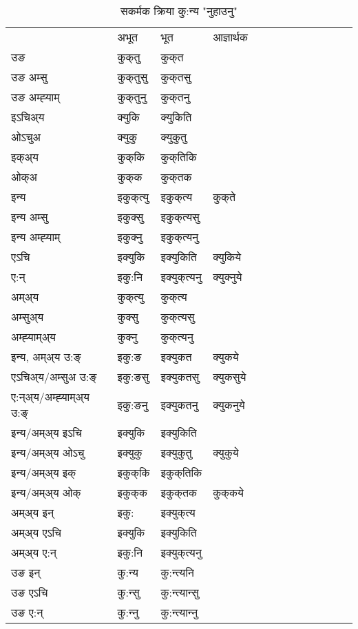 \begin{table}[H]
\centering
\caption{\label{ukt.vt} सकर्मक क्रिया  कु:न्य  "नुहाउनु"  }
\begin{tabular}{l|l|l|l|l|l|l|l|l|l|l|l|l}  \toprule
&अभूत & भूत & आज्ञार्थक \\ 
उङ &कुक्‌तु &कुक्‌त \\ 
उङ अम्सु&कुक्‌तुसु &कुक्‌तसु \\ 
उङ अम्ह्‍याम्&कुक्‌तुनु &कुक्‌तनु \\ 
इऽचिअ्य &क्युकि &क्युकिति   \\ 
ओऽचुअ        &क्युकु &क्युकुतु   \\ 
इक्अ्य&कुक्‌कि &कुक्‌तिकि   \\ 
ओक्अ &कुक्‌क &कुक्‌तक   \\ 
इन्य & इकुक्‌त्यु  & इकुक्‌त्य &कुक्‌ते  \\ 
इन्य अम्सु& इकुक्सु  & इकुक्‌त्यसु   \\ 
इन्य अम्ह्‍याम्& इकुक्‍नु  & इकुक्‌त्यनु   \\ 
एऽचि & इक्युकि & इक्युकिति &क्युकिये    \\ 
ए:न् & इकु:नि  & इक्युक्‌त्यनु &क्युक्‍नुये  \\ 
अम्अ्य & कुक्‌त्यु  & कुक्‌त्य  \\ 
अम्सुअ्य & कुक्सु & कुक्‌त्यसु  \\ 
अम्ह्‍याम्अ्य & कुक्‍नु  & कुक्‌त्यनु \\ 
\midrule
इन्य, अम्अ्य उ:ङ्‌ &इकु:ङ &इक्युकत &क्युकये \\ 
एऽचिअ्य/अम्सुअ उ:ङ्‌ &इकु:ङसु &इक्युकतसु &क्युकसुये \\ 
ए:न्अ्य/अम्ह्‍याम्अ्य उ:ङ्‌ &इकु:ङनु &इक्युकतनु &क्युकनुये \\ 
इन्य/अम्अ्य इऽचि &इक्युकि &इक्युकिति    \\ 
इन्य/अम्अ्य ओऽचु &इक्युकु &इक्युकुतु  &क्युकुये  \\ 
इन्य/अम्अ्य इक् &इकुक्‌कि &इकुक्‌तिकि   \\ 
इन्य/अम्अ्य ओक् &इकुक्‌क &इकुक्‌तक  &कुक्‌कये  \\ 
अम्अ्य इन् & इकु: & इक्युक्‌त्य   \\ 
अम्अ्य एऽचि & इक्युकि & इक्युकिति    \\ 
अम्अ्य ए:न् & इकु:नि  & इक्युक्‌त्यनु  \\ 
\midrule
उङ इन् & कु:न्य  & कु:न्त्यनि  \\ 
उङ एऽचि & कु:न्सु  & कु:न्त्यान्सु   \\ 
उङ ए:न्& कु:न्‍नु  & कु:न्त्यान्‍नु   \\ 
\bottomrule
\end{tabular}
\end{table}


